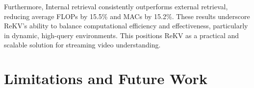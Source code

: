 Furthermore, Internal retrieval consistently outperforms external retrieval, reducing average FLOPs by 15.5\% and MACs by 15.2\%.
These results underscore ReKV’s ability to balance computational efficiency and effectiveness, particularly in dynamic, high-query environments.
This positions ReKV as a practical and scalable solution for streaming video understanding.

\begin{table}[h]
\setlength{\tabcolsep}{1.5mm}
\centering
\caption{
\textbf{TFLOPs / QA.}
}
\label{tab:tflops}
\vspace{-5pt}
\footnotesize
{}
\vspace{-5pt}
\end{table}

\begin{table}[h]
\setlength{\tabcolsep}{1.5mm}
\centering
\caption{
\textbf{TMACs / QA.}
}
\label{tab:tmacs}
\vspace{-5pt}
\footnotesize
{}
\vspace{-5pt}
\end{table}


\section{Limitations and Future Work}
\label{sec:limitation}

